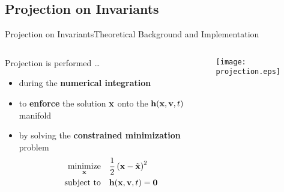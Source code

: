 \subsection{Projection on Invariants}

\begin{frame}{Projection on Invariants}{Theoretical Background and Implementation}
  \vspace{-1.0em}
  \begin{columns}
    \begin{column}[c]{0.6\textwidth}
      Projection is performed \dots
      \begin{itemize}
        \item during the \textbf{numerical integration}
        \item to \textbf{enforce} the solution $\mathbf{x}$ onto the $\mathbf{h}(\mathbf{x}, \mathbf{v}, t)$ manifold
        \item by solving the \textbf{constrained minimization} problem
          \begin{align*}
            \underset{\mathbf{x}}{\text{minimize}} \quad &\dfrac{1}{2}\left(\mathbf{x} - \tilde{\mathbf{x}}\right)^2 \\
            \text{subject to} \quad &\mathbf{h}(\mathbf{x}, \mathbf{v}, t) = \mathbf{0}
          \end{align*}
        \end{itemize}
      \end{column}
      \begin{column}[c]{0.4\textwidth}
        \hspace{-0.2\textwidth}\texttt{[image: projection.eps]}
      \end{column}
    \end{columns}
    \vspace{1.0em}
\end{frame}

